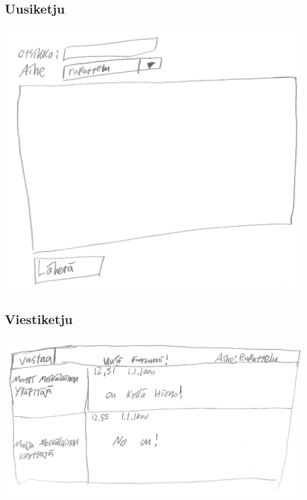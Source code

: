 \documentclass[a4paper, 12pt, finnish]{article}
\begin{document}
\subsection{Uusiketju}
\includegraphics[width=\textwidth,height=\textheight,keepaspectratio]{uusiketju.png}

\subsection{Viestiketju}
\includegraphics[width=\textwidth,height=\textheight,keepaspectratio]{viestiketju.png}
\end{document}
